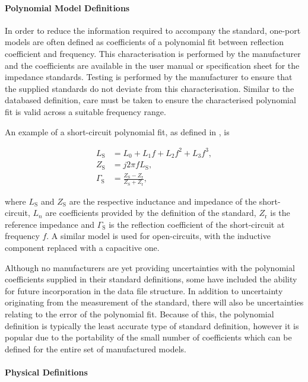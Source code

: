 \documentclass[../thesis/thesis.tex]{subfiles}
\begin{document}
\paragraph{Polynomial Model Definitions}

In order to reduce the information required to accompany the standard, one-port models are often defined as coefficients of a polynomial fit between reflection coefficient and frequency. This characterisation is performed by the manufacturer and the coefficients are available in the user manual or specification sheet for the impedance standards. Testing is performed by the manufacturer to ensure that the supplied standards do not deviate from this characterisation. Similar to the databased definition, care must be taken to ensure the characterised polynomial fit is valid across a suitable frequency range.

An example of a short-circuit polynomial fit, as defined in \cite{Keysight_2016}, is

\begin{align}
	L_\textrm{S} &= L_0 + L_1f + L_2f^2 + L_3f^3, \\
	Z_\textrm{S} &= j2\pi fL_\textrm{S}, \\
	\Gamma_\textrm{S} &= \frac{Z_\textrm{S} - Z_\textrm{r}}{Z_\textrm{S} + Z_\textrm{r}},
\end{align}

where $L_\textrm{S}$ and $Z_\textrm{S}$ are the respective inductance and impedance of the short-circuit, $L_n$ are coefficients provided by the definition of the standard,  $Z_\textrm{r}$ is the reference impedance and $\Gamma_\textrm{S}$ is the reflection coefficient of the short-circuit at frequency $f$. A similar model is used for open-circuits, with the inductive component replaced with a capacitive one.

Although no manufacturers are yet providing uncertainties with the polynomial coefficients supplied in their standard definitions, some have included the ability for future incorporation in the data file structure. In addition to uncertainty originating from the measurement of the standard, there will also be uncertainties relating to the error of the polynomial fit. Because of this, the polynomial definition is typically the least accurate type of standard definition, however it is popular due to the portability of the small number of coefficients which can be defined for the entire set of manufactured models.

\paragraph{Physical Definitions}
\end{document}
